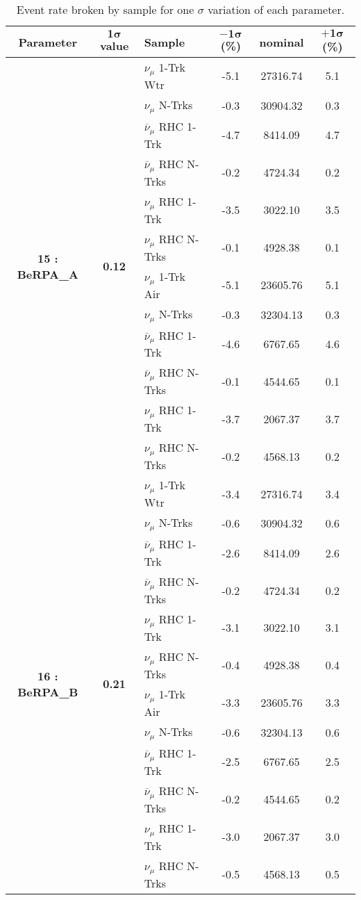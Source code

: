 \addtocounter{table}{-1}
\begin{table}[ht!]
\centering
\begin{tabular}{ c  c  l  c  c  c }
\midrule[1.3pt]
\textbf{Parameter} & \textbf{$\mathbf{1\sigma}$ value} & \textbf{Sample} & \textbf{$\mathbf{-1\sigma}$ (\%)}  &  \textbf{nominal}  &  \textbf{$\mathbf{+1\sigma}$ (\%)} \\
\midrule[1.3pt]
\multirow{12}{*}{\textbf{15 : BeRPA\_A}} & \multirow{12}{*}{\textbf{0.12}} & $\nu_\mu$ 1-Trk Wtr &   -5.1 &  27316.74 &   5.1 \\ 
 &  & $\nu_\mu$ N-Trks &   -0.3 &  30904.32 &   0.3 \\ 
 &  & $\overline{\nu}_\mu$ RHC 1-Trk &   -4.7 &  8414.09 &   4.7 \\ 
 &  & $\overline{\nu}_\mu$ RHC N-Trks &   -0.2 &  4724.34 &   0.2 \\ 
 &  & $\nu_\mu$ RHC 1-Trk &   -3.5 &  3022.10 &   3.5 \\ 
 &  & $\nu_\mu$ RHC N-Trks &   -0.1 &  4928.38 &   0.1 \\ 
 &  & $\nu_\mu$ 1-Trk Air &   -5.1 &  23605.76 &   5.1 \\ 
 &  & $\nu_\mu$ N-Trks &   -0.3 &  32304.13 &   0.3 \\ 
 &  & $\overline{\nu}_\mu$ RHC 1-Trk &   -4.6 &  6767.65 &   4.6 \\ 
 &  & $\overline{\nu}_\mu$ RHC N-Trks &   -0.1 &  4544.65 &   0.1 \\ 
 &  & $\nu_\mu$ RHC 1-Trk &   -3.7 &  2067.37 &   3.7 \\ 
 &  & $\nu_\mu$ RHC N-Trks &   -0.2 &  4568.13 &   0.2 \\ 
\midrule[1.3pt]
\multirow{12}{*}{\textbf{16 : BeRPA\_B}} & \multirow{12}{*}{\textbf{0.21}} & $\nu_\mu$ 1-Trk Wtr &   -3.4 &  27316.74 &   3.4 \\ 
 &  & $\nu_\mu$ N-Trks &   -0.6 &  30904.32 &   0.6 \\ 
 &  & $\overline{\nu}_\mu$ RHC 1-Trk &   -2.6 &  8414.09 &   2.6 \\ 
 &  & $\overline{\nu}_\mu$ RHC N-Trks &   -0.2 &  4724.34 &   0.2 \\ 
 &  & $\nu_\mu$ RHC 1-Trk &   -3.1 &  3022.10 &   3.1 \\ 
 &  & $\nu_\mu$ RHC N-Trks &   -0.4 &  4928.38 &   0.4 \\ 
 &  & $\nu_\mu$ 1-Trk Air &   -3.3 &  23605.76 &   3.3 \\ 
 &  & $\nu_\mu$ N-Trks &   -0.6 &  32304.13 &   0.6 \\ 
 &  & $\overline{\nu}_\mu$ RHC 1-Trk &   -2.5 &  6767.65 &   2.5 \\ 
 &  & $\overline{\nu}_\mu$ RHC N-Trks &   -0.2 &  4544.65 &   0.2 \\ 
 &  & $\nu_\mu$ RHC 1-Trk &   -3.0 &  2067.37 &   3.0 \\ 
 &  & $\nu_\mu$ RHC N-Trks &   -0.5 &  4568.13 &   0.5 \\ 
\midrule[1.3pt]
\end{tabular}
\centering
\caption{Event rate broken by sample for one $\sigma$ variation of each parameter.}
\end{table}
